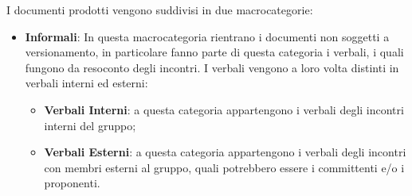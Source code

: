 I documenti prodotti vengono suddivisi in due macrocategorie:
\begin{itemize}
    \item \textbf{Informali}: In questa macrocategoria rientrano i documenti non soggetti a versionamento, in 
    particolare fanno parte di questa categoria i verbali, i quali fungono da resoconto degli incontri. I verbali 
    vengono a loro volta distinti in verbali interni ed esterni:
    \begin{itemize}
        \item \textbf{Verbali Interni}: a questa categoria appartengono i verbali degli incontri interni del gruppo;
        \item \textbf{Verbali Esterni}: a questa categoria appartengono i verbali degli incontri con membri esterni al 
        gruppo, quali potrebbero essere i committenti e/o i proponenti.
    \end{itemize}
    

\end{itemize}
